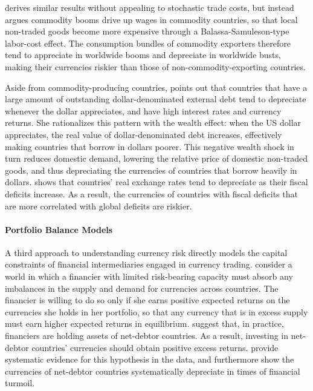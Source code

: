 \documentclass{ar-1col}
\begin{document}
\citet{Powers2015} derives similar results without appealing to stochastic trade costs, but instead argues commodity booms drive up wages in commodity countries, so that local non-traded goods become more expensive through a Balassa-Samuleson-type labor-cost effect. The consumption bundles of commodity exporters therefore tend to appreciate in worldwide booms and depreciate in worldwide busts, making their currencies riskier than those of non-commodity-exporting countries.

Aside from commodity-producing countries, \citet{Wiriadinata2020} points out that countries that have a large amount of outstanding dollar-denominated external debt tend to depreciate whenever the dollar appreciates, and have high interest rates and currency returns. She rationalizes this pattern with the wealth effect: when the US dollar appreciates, the real value of dollar-denominated debt increases, effectively making countries that borrow in dollars poorer. This negative wealth shock in turn reduces domestic demand, lowering the relative price of domestic non-traded goods, and thus depreciating the currencies of countries that borrow heavily in dollars. \citet{Jiang2020} shows that countries' real exchange rates tend to depreciate as their fiscal deficits increase. As a result, the currencies of countries with fiscal deficits that are more correlated with global deficits are riskier.

\paragraph*{Portfolio Balance Models} A third approach to understanding currency risk directly models the capital constraints of financial intermediaries engaged in currency trading. \citet{GabaixMaggiori2015} consider a world in which a financier with limited risk-bearing capacity must absorb any imbalances in the supply and demand for currencies across countries. The financier is willing to do so only if she earns positive expected returns on the currencies she holds in her portfolio, so that any currency that is in excess supply must earn higher expected returns in equilibrium.  \citet{GabaixMaggiori2015} suggest that, in practice, financiers are holding assets of net-debtor countries. As a result, investing in net-debtor countries' currencies should obtain positive excess returns. \citet{DellaCorteetal2016} provide systematic evidence for this hypothesis in the data, and furthermore show the currencies of net-debtor countries systematically depreciate in times of financial turmoil.
\end{document}
